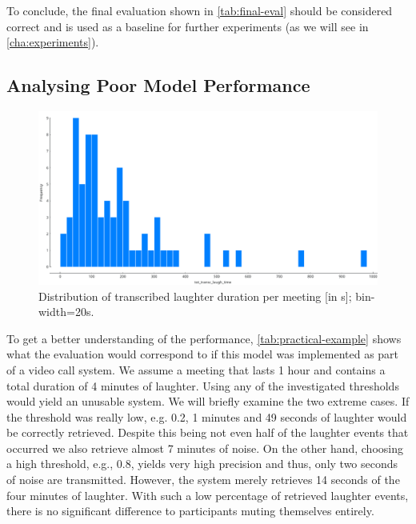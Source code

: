 \documentclass[bsc,frontabs,parskip,deptreport]{infthesis}
\begin{document}
To conclude, the final evaluation shown in \autoref{tab:final-eval} should be considered correct and is used as a baseline for further experiments (as we will see in \autoref{cha:experiments}).



\subsection{Analysing Poor Model Performance}

\begin{figure}
    \centering
    \includegraphics[width=13cm]{imgs/distributions/transcribed_laughter_time_distribution.png}
    \caption{Distribution of transcribed laughter duration per meeting [in s]; bin-width=20s.}
    \label{fig:transc-laughter-distribution}
\end{figure}



To get a better understanding of the performance, \autoref{tab:practical-example} shows what the evaluation would correspond to if this model was implemented as part of a video call system. We assume a meeting that lasts 1 hour and contains a total duration of 4 minutes of laughter. 
Using any of the investigated thresholds would yield an unusable system.
We will briefly examine the two extreme cases. If the threshold was really low, e.g. 0.2, 1 minutes and 49 seconds of laughter would be correctly retrieved. Despite this being not even half of the laughter events that occurred we also retrieve almost 7 minutes of noise.  
On the other hand, choosing a high threshold, e.g., 0.8, yields very high precision and thus, only two seconds of noise are transmitted. However, the system merely retrieves 14 seconds of the four minutes of laughter. With such a low percentage of retrieved laughter events, there is no significant difference to participants muting themselves entirely. 
\end{document}
